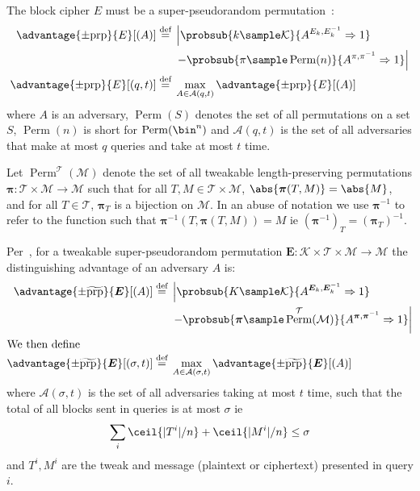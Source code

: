 \documentclass[letterpaper,11pt]{article}
\newcommand*{\defeq}{\stackrel{\text{def}}{=}}
\DeclareMathOperator{\Perm}{Perm}
\begin{document}
The block cipher
$E$
must be a super-pseudorandom permutation~\cite{concrete}:
%
\begin{align*}
    \advantage{\pm \mathrm{prp}}{E}[(A)] \defeq
    {}&\left\lvert\probsub{k \sample \mathcal{K}}{A^{E_k,E_k^{-1}}\Rightarrow 1}\right.
    \\
    {}&\left. - \probsub{\pi \sample \Perm(n)}{A^{\pi,\pi^{-1}}\Rightarrow 1}\right\rvert
    \\
    \advantage{\pm \mathrm{prp}}{E}[(q, t)] \defeq
    {}&\max_{A \in \mathcal{A}(q, t)} \advantage{\pm \mathrm{prp}}{E}[(A)]
\end{align*}
%
where $A$ is an adversary,
$\Perm(S)$ denotes the set of all permutations on a set $S$,
$\Perm(n)$ is short for $\Perm(\bin^n)$
and
$\mathcal{A}(q, t)$
is the set of all adversaries that make at most $q$ queries and take at most $t$ time.

Let $\Perm^\mathcal{T}(\mathcal{M})$
denote the set of all
tweakable length-preserving permutations
$\bm{\pi} : \mathcal{T} \times \mathcal{M} \rightarrow \mathcal{M}$
such that for all $T, M \in \mathcal{T} \times \mathcal{M}$,
$\abs{\bm{\pi}(T, M)} = \abs{M}$, and
for all $T \in \mathcal{T}$, $\bm{\pi}_{T}$ is a bijection on \(\mathcal{M}\).
In an abuse of notation
we use $\bm{\pi}^{-1}$ to refer to the function
such that $\bm{\pi}^{-1}(T, \bm{\pi}(T, M)) = M$ ie $(\bm{\pi}^{-1})_T = (\bm{\pi}_T)^{-1}$.

Per~\cite{cmc}, for a tweakable super-pseudorandom permutation
$\bm{E} : \mathcal{K} \times \mathcal{T} \times \mathcal{M} \rightarrow \mathcal{M}$
the distinguishing advantage of an adversary $A$ is:
%
\begin{align*}
    \advantage{\pm \widetilde{\mathrm{prp}}}{\bm{E}}[(A)] \defeq
    {}&\left\lvert\probsub{K \sample \mathcal{K}}{A^{\bm{E}_k,\bm{E}_k^{-1}}\Rightarrow 1}\right.
    \\
    {}&\left. - \probsub{\bm{\pi} \sample \Perm^\mathcal{T}(\mathcal{M})}
        {A^{\bm{\pi},\bm{\pi}^{-1}}\Rightarrow 1}\right\rvert
    \\
    \intertext{We then define}
    \advantage{\pm \widetilde{\mathrm{prp}}}{\bm{E}}[(\sigma, t)]
    \defeq {}&
    \max_{A \in \mathcal{A}(\sigma, t)} \advantage{\pm \widetilde{\mathrm{prp}}}{\bm{E}}[(A)]
\end{align*}
where \(\mathcal{A}(\sigma, t)\)
is the set of all adversaries taking at most \(t\) time,
such that the total of all blocks sent in queries is
at most \(\sigma\) ie
\begin{displaymath}
    \sum_i \ceil{|T^i|/n} + \ceil{|M^i|/n} \leq \sigma
\end{displaymath}
and \(T^i, M^i\) are the tweak and message
(plaintext or ciphertext)
presented in query \(i\).
\end{document}
